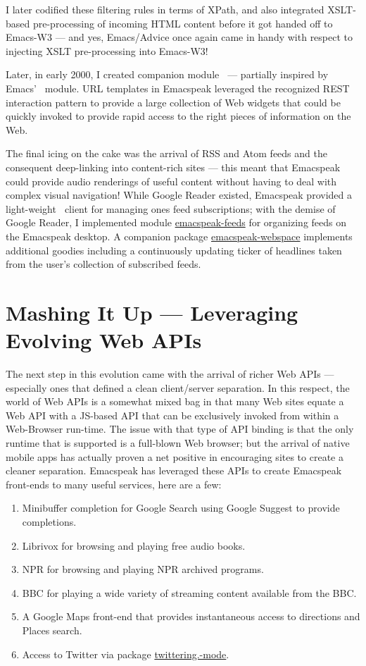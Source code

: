 \documentclass[11pt]{article}
\begin{document}
I later codified these filtering rules in terms of XPath, and
also integrated XSLT-based pre-processing of incoming HTML
content before it got handed off to Emacs-W3 — and yes,
Emacs/Advice once again came in handy with respect to injecting
XSLT pre-processing into Emacs-W3!

Later, in early 2000, I created companion module
$_{\text{ }}$— partially inspired by Emacs'
$_{\text{ }}$module. URL templates in Emacspeak leveraged the
recognized REST interaction pattern to provide a large collection
of Web widgets that could be quickly invoked to provide rapid
access to the right pieces of information on the Web.

The final icing on the cake was the arrival of RSS and Atom feeds
and the consequent deep-linking into content-rich sites — this
meant that Emacspeak could provide audio renderings of useful
content without having to deal with complex visual navigation!
While Google Reader existed, Emacspeak provided a light-weight
$_{\text{ }}$client for managing ones feed subscriptions; with the
demise of Google Reader, I implemented module \uline{emacspeak-feeds}
for organizing feeds on the Emacspeak desktop. A companion
package \uline{emacspeak-webspace} implements additional goodies
including a continuously updating ticker of headlines taken from
the user's collection of subscribed feeds.


\section{Mashing It Up —  Leveraging Evolving Web APIs}
\label{sec-15}

The next step in this evolution came with the arrival of richer
Web APIs — especially ones that defined a clean client/server
separation. In this respect, the world of Web APIs is a somewhat
mixed bag in that many Web sites equate a Web API with a JS-based
API that can be exclusively invoked from within a Web-Browser
run-time. The issue with that type of API binding is that the
only runtime that is supported is a full-blown Web browser; but
the arrival of native mobile apps has actually proven a net
positive in encouraging sites to create a cleaner
separation. Emacspeak has leveraged these APIs to create
Emacspeak front-ends to many useful services, here are a few:

\begin{enumerate}
\item Minibuffer completion for Google Search using Google Suggest
to provide completions.
\item Librivox for browsing  and playing free audio books.
\item NPR  for browsing and playing NPR archived programs.
\item BBC for playing a wide variety of streaming content
available from the BBC.
\item A Google Maps front-end that  provides instantaneous access
to directions and Places search.
\item Access to Twitter via package \uline{twittering.-mode}.
\end{enumerate}
\end{document}

